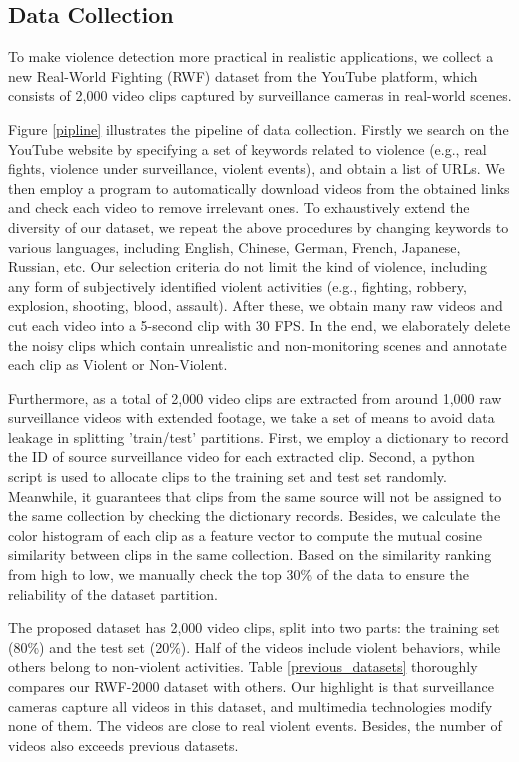 \documentclass[a4paper,conference]{IEEEtran}
\begin{document}
\subsection{Data Collection}
\label{data_collection}
To make violence detection more practical in realistic applications, we collect a new Real-World Fighting (RWF) dataset from the YouTube platform, which consists of 2,000 video clips captured by surveillance cameras in real-world scenes. 

Figure \ref{pipline} illustrates the pipeline of data collection. Firstly we search on the YouTube website by specifying a set of keywords related to violence (e.g., real fights, violence under surveillance, violent events), and obtain a list of URLs. We then employ a program to automatically download videos from the obtained links and check each video to remove irrelevant ones. To exhaustively extend the diversity of our dataset, we repeat the above procedures by changing keywords to various languages, including English, Chinese, German, French, Japanese, Russian, etc. Our selection criteria do not limit the kind of violence, including any form of subjectively identified violent activities (e.g., fighting, robbery, explosion, shooting, blood, assault). After these, we obtain many raw videos and cut each video into a 5-second clip with 30 FPS. In the end, we elaborately delete the noisy clips which contain unrealistic and non-monitoring scenes and annotate each clip as Violent or Non-Violent. 

Furthermore, as a total of 2,000 video clips are extracted from around 1,000 raw surveillance videos with extended footage, we take a set of means to avoid data leakage in splitting 'train/test' partitions. First, we employ a dictionary to record the ID of source surveillance video for each extracted clip. Second, a python script is used to allocate clips to the training set and test set randomly. Meanwhile, it guarantees that clips from the same source will not be assigned to the same collection by checking the dictionary records. Besides, we calculate the color histogram of each clip as a feature vector to compute the mutual cosine similarity between clips in the same collection. Based on the similarity ranking from high to low, we manually check the top 30\% of the data to ensure the reliability of the dataset partition. 

The proposed dataset has 2,000 video clips, split into two parts: the training set (80\%) and the test set (20\%). Half of the videos include violent behaviors, while others belong to non-violent activities. Table \ref{previous_datasets} thoroughly compares our RWF-2000 dataset with others. Our highlight is that surveillance cameras capture all videos in this dataset, and multimedia technologies modify none of them. The videos are close to real violent events. Besides, the number of videos also exceeds previous datasets. 
\end{document}
